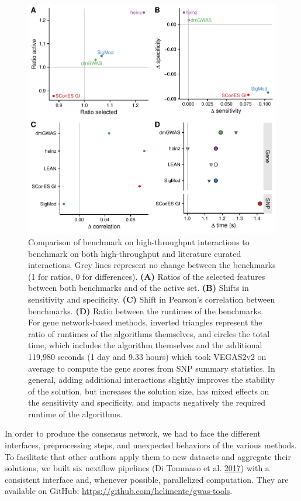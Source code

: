\documentclass[
  11pt,
]{env/yjiao}
\begin{document}
\begin{figure}
\centering
\includegraphics{fig/sfigure_10.pdf}
\caption{\label{fig:lc-ht-comparison}Comparison of benchmark on high-throughput interactions to benchmark on both high-throughput and literature curated interactions. Grey lines represent no change between the benchmarks (1 for ratios, 0 for differences). \textbf{(A)} Ratios of the selected features between both benchmarks and of the active set. \textbf{(B)} Shifts in sensitivity and specificity. \textbf{(C)} Shift in Pearson's correlation between benchmarks. \textbf{(D)} Ratio between the runtimes of the benchmarks. For gene network-based methods, inverted triangles represent the ratio of runtimes of the algorithms themselves, and circles the total time, which includes the algorithm themselves and the additional 119,980 seconds (1 day and 9.33 hours) which took VEGAS2v2 on average to compute the gene scores from SNP summary statistics. In general, adding additional interactions slightly improves the stability of the solution, but increases the solution size, has mixed effects on the sensitivity and specificity, and impacts negatively the required runtime of the algorithms.}
\end{figure}

In order to produce the consensus network, we had to face the different
interfaces, preprocessing steps, and unexpected behaviors of the various
methods. To facilitate that other authors apply them to new datasets and
aggregate their solutions, we built six nextflow pipelines
(Di Tommaso et al. \protect\hyperlink{ref-di_tommaso_nextflow_2017}{2017}) with a consistent interface and, whenever
possible, parallelized computation. They are available on GitHub:
\url{https://github.com/hclimente/gwas-tools}.
\end{document}
